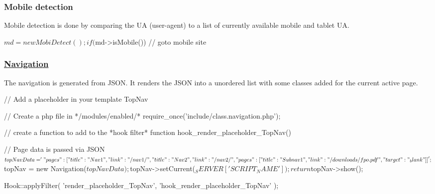 \subsubsection*{Mobile detection}

Mobile detection is done by comparing the U\-A (user-\/agent) to a list of currently available mobile and tablet U\-A. \begin{DoxyVerb}$md = new MobiDetect();

if ($md->isMobile()) {
    // goto mobile site
}
\end{DoxyVerb}


\subsubsection*{\hyperlink{class_navigation}{Navigation}}

The navigation is generated from J\-S\-O\-N. It renders the J\-S\-O\-N into a unordered list with some classes added for the current active page. \begin{DoxyVerb}// Add a placeholder in your template
{{ TopNav }}

// Create a php file in */modules/enabled/*
require_once('include/class.navigation.php');

// create a function to add to the *hook filter*
function hook_render_placeholder_TopNav() {

    // Page data is passed via JSON
    $topNavData = '{
        "pages": [
            {
                "title": "Nav 1",
                "link": "/nav1/"
            }, {
                "title": "Nav 2",
                "link": "/nav2/",
                "pages": [
                    {
                        "title": "Subnav 1",
                        "link": "/downloads/fpo.pdf",
                        "target": "_blank"
                    }
                ]
            }
        ]
    }';

    $topNav = new Navigation($topNavData);
    $topNav->setCurrent($_SERVER['SCRIPT_NAME']);

    return $topNav->show();
}

Hook::applyFilter(
    'render_placeholder_TopNav',
    'hook_render_placeholder_TopNav'
);\end{DoxyVerb}
 